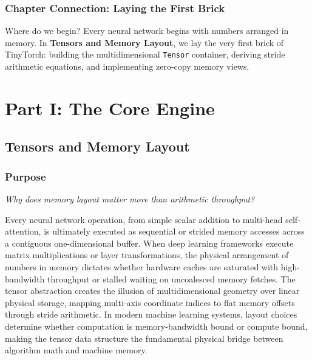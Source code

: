 \documentclass[
  letterpaper,
]{scrbook}
\begin{document}
\section*{Chapter Connection: Laying the First
Brick}\label{chapter-connection-laying-the-first-brick}


Where do we begin? Every neural network begins with numbers arranged in
memory. In \textbf{Tensors and Memory Layout}, we lay the very first
brick of TinyTorch: building the multidimensional \texttt{Tensor}
container, deriving stride arithmetic equations, and implementing
zero-copy memory views.

\part{Part I: The Core Engine}

\chapter{Tensors and Memory Layout}\label{tensors-and-memory-layout}

\section*{Purpose}\label{purpose-1}


\emph{Why does memory layout matter more than arithmetic throughput?}

Every neural network operation, from simple scalar addition to
multi-head self-attention, is ultimately executed as sequential or
strided memory accesses across a contiguous one-dimensional buffer. When
deep learning frameworks execute matrix multiplications or layer
transformations, the physical arrangement of numbers in memory dictates
whether hardware caches are saturated with high-bandwidth throughput or
stalled waiting on uncoalesced memory fetches. The tensor abstraction
creates the illusion of multidimensional geometry over linear physical
storage, mapping multi-axis coordinate indices to flat memory offsets
through stride arithmetic. In modern machine learning systems, layout
choices determine whether computation is memory-bandwidth bound or
compute bound, making the tensor data structure the fundamental physical
bridge between algorithm math and machine memory.
\end{document}
